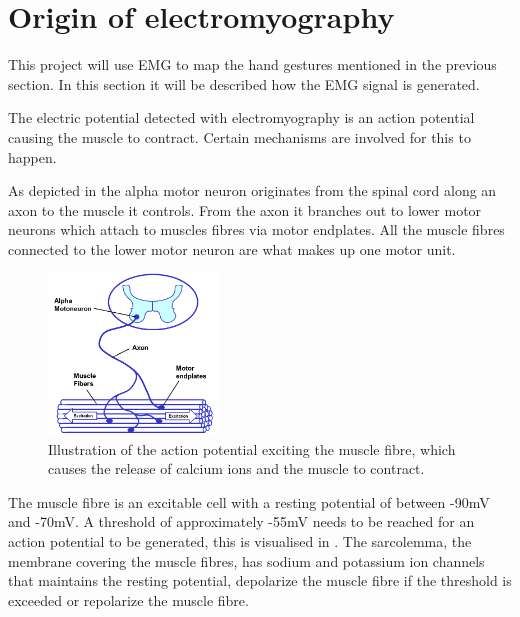 \section{Origin of electromyography} \label{sec:physiology}
This project will use EMG to map the hand gestures mentioned in the previous section. In this section it will be described how the EMG signal is generated.%

The electric potential detected with electromyography is an action potential causing the muscle to contract. Certain mechanisms are involved for this to happen. 


As depicted in  the alpha motor neuron originates from the spinal cord along an axon to the muscle it controls. From the axon it branches out to lower motor neurons which attach to muscles fibres via motor endplates. All the muscle fibres connected to the lower motor neuron are what makes up one motor unit.

\begin{figure}[H]
	\includegraphics[width=0.4\textwidth]{figures/Anatomy/EMG_generation}  %
	\caption{Illustration of the action potential exciting the muscle fibre, which causes the release of calcium ions and the muscle to contract. \cite{konrad2005}}
	\label{fig:EMG_generation}  %
\end{figure}


The muscle fibre is an excitable cell with a resting potential of between -90mV and -70mV. A threshold of approximately -55mV needs to be reached for an action potential to be generated, this is visualised in . The sarcolemma, the membrane covering the muscle fibres, has sodium and potassium ion channels that maintains the resting potential, depolarize the muscle fibre if the threshold is exceeded or repolarize the muscle fibre. \cite{cram2012}


